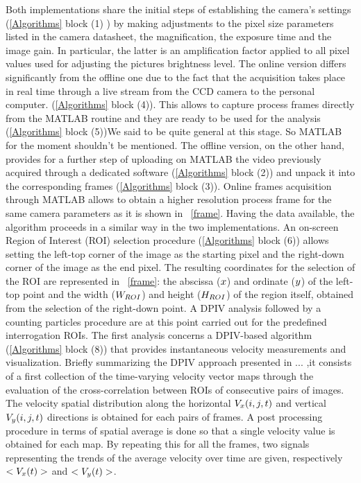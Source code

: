 \documentclass[journal]{IEEEtran}
\theoremstyle{definition}
\theoremstyle{remark}
\begin{document}
Both implementations share the initial steps of establishing the camera's settings (\fig\ref{Algorithms} block (1) ) by making adjustments to the pixel size parameters listed in the camera datasheet, the magnification, the exposure time and the image gain. In particular, the latter is an amplification factor applied to all pixel values used for adjusting the pictures brightness level.
The online version differs significantly from the offline one due to the fact that the acquisition takes place in real time through a live stream from the CCD camera to the personal computer.  (\fig\ref{Algorithms} block (4)). This allows to capture process frames directly from the MATLAB routine and they are ready to be used for the analysis (\fig\ref{Algorithms} block (5)){We said to be quite general at this stage. So MATLAB for the moment shouldn't be mentioned}. The offline version, on the other hand, provides for a further step of uploading on MATLAB the video previously acquired through a dedicated software (\fig\ref{Algorithms} block (2)) and unpack it into the corresponding frames (\fig\ref{Algorithms} block (3)). 
Online frames acquisition through MATLAB allows to obtain a higher resolution process frame for the same camera parameters as it is shown in ~\fig\ref{frame}.
Having the data available, the algorithm proceeds in a similar way in the two implementations. 
An on-screen Region of Interest (ROI) selection procedure (\fig\ref{Algorithms} block (6)) allows setting the left-top corner of the image as the starting pixel and the right-down corner of the image as the end pixel. The resulting coordinates for the selection of the ROI are represented in ~\fig\ref{frame}: the abscissa ($x$) and ordinate ($y$) of the left-top point and the width ($W_{ROI}$) and height ($H_{ROI}$) of the region itself, obtained from the selection of the right-down point. 
A DPIV analysis followed by a counting particles procedure are at this point carried out for the predefined interrogation ROIs. 
The first analysis concerns a DPIV-based algorithm (\fig\ref{Algorithms} block (8)) that provides instantaneous velocity measurements and visualization. Briefly summarizing the DPIV approach presented in ... ,it consists of a first collection of the time-varying velocity vector maps through the evaluation of the cross-correlation between ROIs of consecutive pairs of images. 
The velocity spatial distribution along the horizontal $V_{x}({i},{j},t)$ and vertical $V_{y}({i},{j},t)$ directions is obtained for each pairs of frames. A post processing procedure in terms of spatial average is done so that a single velocity value is obtained for each map. By repeating this for all the frames, two signals representing the trends of the average velocity over time are given, respectively $<V_{x}(t)>$ and $<V_{y}(t)>$.
\end{document}
